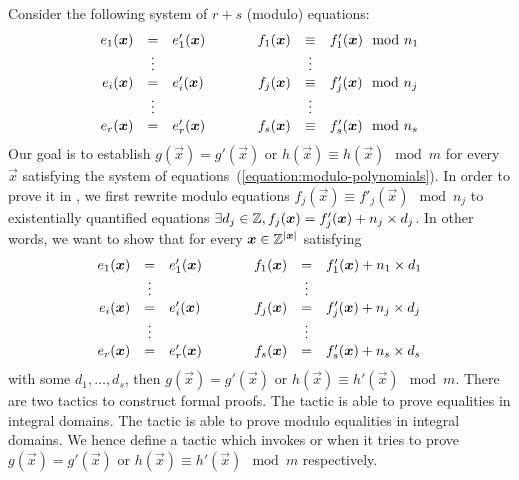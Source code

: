 
Consider the following system of $r + s$ (modulo) equations:
\begin{equation}
  \label{equation:modulo-polynomials}
  \begin{array}{rclcrcl}
    e_1 (\vec{x}) & = & e'_1 (\vec{x}) 
    & \hspace{.05\textwidth} &
    f_1 (\vec{x}) & \equiv & f'_1 (\vec{x}) \mod n_1\\
    & \vdots & & & & \vdots \\
    e_i (\vec{x}) & = & e'_i (\vec{x}) & &
    f_j (\vec{x}) & \equiv & f'_j (\vec{x}) \mod n_j\\
    & \vdots & & & & \vdots \\
    e_r (\vec{x}) & = & e'_r (\vec{x}) & &
    f_s (\vec{x}) & \equiv & f'_s (\vec{x}) \mod n_s
  \end{array}
\end{equation}
Our goal is to establish $g (\vec{x}) = g' (\vec{x})$ or $h (\vec{x})
\equiv h (\vec{x}) \mod m$ for every $\vec{x}$ satisfying the system
of equations~(\ref{equation:modulo-polynomials}). In order to prove it
in \coq, we first rewrite modulo equations $f_j (\vec{x}) \equiv f'_j
(\vec{x}) \mod n_j$ to existentially quantified equations $\exists d_j
\in \bbfZ, f_j (\vec{x}) = f'_j (\vec{x}) + n_j \times d_j$. In other
words, we want to show that for every $\vec{x} \in \bbfZ^{|\vec{x}|}$
satisfying 
\begin{equation}
  \label{equation:polynomials}
  \begin{array}{rclcrcl}
    e_1 (\vec{x}) & = & e'_1 (\vec{x}) 
    & \hspace{.05\textwidth} &
    f_1 (\vec{x}) & = & f'_1 (\vec{x}) + n_1 \times d_1 \\
    & \vdots & & & & \vdots \\
    e_i (\vec{x}) & = & e'_i (\vec{x}) & &
    f_j (\vec{x}) & = & f'_j (\vec{x}) + n_j \times d_j \\
    & \vdots & & & & \vdots \\
    e_r (\vec{x}) & = & e'_r (\vec{x}) & &
    f_s (\vec{x}) & = & f'_s (\vec{x}) + n_s \times d_s
  \end{array}
\end{equation}
with some $d_1, \ldots, d_s$, then $g (\vec{x}) = g' (\vec{x})$ or $h
(\vec{x}) \equiv h' (\vec{x}) \mod m$. There are two \coq tactics to
construct formal proofs. The tactic  is able to prove
equalities in integral domains. The tactic  is able
to prove modulo equalities in integral domains. We hence define a
\coq tactic which invokes  or  when
it tries to prove $g (\vec{x}) = g' (\vec{x})$ or $h (\vec{x}) \equiv
h' (\vec{x}) \mod m$ respectively.